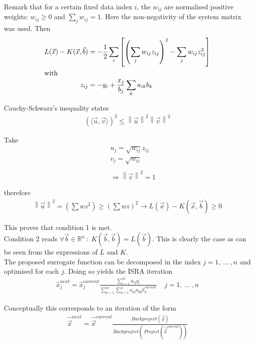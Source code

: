 \documentclass[report,12pt]{report}
\begin{document}
Remark that for a certain fixed data index $i$, the $w_{ij}$ are normalised positive weights: $w_{ij} \geq 0$ and $\sum_j w_{ij} = 1$. Here the non-negativity of the system matrix was used. Then
\begin{align}
	L(\vec x) - K(\vec x, \vec b) &= -\frac{1}{2}\sum_i 
	\left[\left( \sum_j w_{ij}z_{ij} \right)^2
	- \sum_j w_{ij}z_{ij}^2
	\right]
	\\
	\shortintertext{with}
	z_{ij} &= -y_i + \frac{x_j}{b_j} \sum_k a_{ik}b_k
\end{align}


Cauchy-Schwarz's inequality states 
\begin{eqnarray}
	\left( \langle \vec u, \vec v \rangle \right)^2 \leq \left \| \vec u \right \|^2
	\left \| \vec v \right \|^2
\end{eqnarray}

Take
\begin{eqnarray}
	&&u_j = \sqrt{w_{ij}} z_{ij}\nonumber\\
	&&v_j = \sqrt{w_{ij}}\\
	\nonumber\\
	&&\Rightarrow \left \| \vec v \right \|^2 = 1
\end{eqnarray}

therefore
\begin{eqnarray}
	\left \| \vec u \right \|^2 = 
	\left( \sum w z^2 \right) \geq \left( \sum wz \right)^2
	\rightarrow L(\vec x) - K(\vec x, \vec b) \geq 0
\end{eqnarray}

This proves that condition 1 is met.\\

Condition 2 reads $\forall \vec b \in \mathbb{R}^n \ :\ K(\vec b, \vec b) = L(\vec b)$. This is clearly the case as can be seen from the expressions of $L$ and $K$.\\

The proposed surrogate function can be decomposed in the index $j = 1,\ ...\ ,n$ and optimised for each $j$. Doing so yields the ISRA iteration
\begin{align}
	\hat x_j^{next} = \hat x_j^{current}\frac
	{\sum_{i=1}^{m} a_{ij}y_i}
	{\sum_{p=1}^{m} \sum_{q=1}^{n} a_{pj}a_{pq}\hat x_q^{current}}\ \ \ \ \ j = 1,\ ...\ ,n
\end{align}

Conceptually this corresponds to an iteration of the form
\begin{align}
	\hat{\vec{x}}^{next} = \hat{\vec{x}}^{current} \frac{Backproject(\vec y)}{Backproject(\ Project(\hat{\vec{x}}^{current}))}
	\label{eq:ISRAConceptual}
\end{align}
\end{document}

